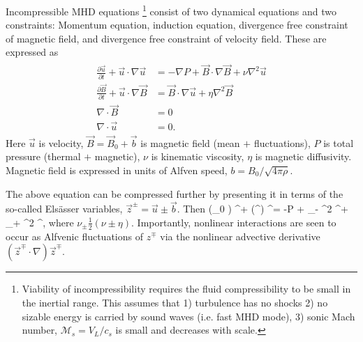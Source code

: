 \documentclass[usenatbib,twocolumn]{aastex63}
\begin{document}
Incompressible MHD equations%
\footnote{
    Viability of incompressibility requires the fluid compressibility to be small in the inertial range.
    This assumes that 
    1) turbulence has no shocks
    2) no sizable energy is carried by sound waves (i.e. fast MHD mode),
    3) sonic Mach number, $\mathcal{M}_s = V_L/c_s$ is small and decreases with scale.
}
consist of two dynamical equations and two constraints:
Momentum equation,
induction equation,
divergence free constraint of magnetic field,
and divergence free constraint of velocity field.
These are expressed as
\begin{align}\begin{split}
    \frac{\partial \vec{u}}{\partial t} + \vec{u} \cdot \nabla \vec{u} &= -\nabla P + \vec{B} \cdot \nabla \vec{B} + \nu \nabla^2 \vec{u} \\
    \frac{\partial \vec{B}}{\partial t} + \vec{u} \cdot \nabla \vec{B} &= \vec{B} \cdot \nabla \vec{u} + \eta \nabla^2 \vec{B} \\
    \nabla \cdot \vec{B} &= 0\\
    \nabla \cdot \vec{u} &= 0.
\end{split}\end{align}
Here $\vec{u}$ is velocity, $\vec{B} = \vec{B}_0 + \vec{b}$ is magnetic field (mean $+$ fluctuations), $P$ is total pressure (thermal $+$ magnetic), $\nu$ is kinematic viscosity, $\eta$ is magnetic diffusivity.
Magnetic field is expressed in units of Alfven speed, $b = B_0/\sqrt{4\pi \rho}$.

The above equation can be compressed further by presenting it in terms of the so-called Els\"asser variables, $\vec{z}^\pm = \vec{u} \pm \vec{b}$.
Then
\be
     \mp (_0 \cdot \nabla) ^\pm + (^\mp \cdot \nabla) ^\pm = -\nabla P  + \nu_- \nabla^2 ^\pm  + \nu_+ \nabla^2 ^\mp,
\ee
where $\nu_\pm \frac{1}{2} (\nu \pm \eta)$.
Importantly, nonlinear interactions are seen to occur as Alfvenic fluctuations of $z^\mp$ via the nonlinear advective derivative $(\vec{z}^\mp \cdot \nabla) \vec{z}^\mp$.
\end{document}
